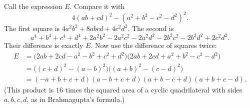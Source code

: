 Call the expression $E$. Compare it with
\[
4(ab+cd)^2-(a^2+b^2-c^2-d^2)^2 .
\]
The first square is $4a^2b^2+8abcd+4c^2d^2$. The second is
\[
a^4+b^4+c^4+d^4+2a^2b^2-2a^2c^2-2a^2d^2-2b^2c^2-2b^2d^2+2c^2d^2 .
\]
Their difference is exactly $E$. Now use the difference of squares twice:
\[
\begin{aligned}
E&=\bigl(2ab+2cd-a^2-b^2+c^2+d^2\bigr)\bigl(2ab+2cd+a^2+b^2-c^2-d^2\bigr)\\
&=\bigl((c+d)^2-(a-b)^2\bigr)\bigl((a+b)^2-(c-d)^2\bigr)\\
&=\boxed{(-a+b+c+d)(a-b+c+d)(a+b-c+d)(a+b+c-d)} .
\end{aligned}
\]
(This product is $16$ times the squared area of a cyclic quadrilateral with sides $a,b,c,d$, as in Brahmagupta's formula.)

